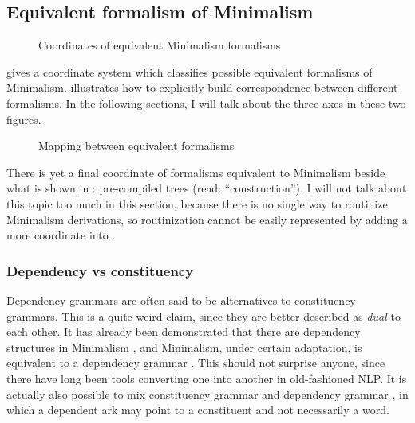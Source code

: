 \documentclass[../main.tex]{subfiles}
\begin{document}


\subsection{Equivalent formalism of Minimalism}

\begin{figure}
    \centering
    
    \caption{Coordinates of equivalent Minimalism formalisms} 
    \label{fig:coordinate-minimalism}
\end{figure}

 gives a coordinate system which classifies possible equivalent formalisms
of Minimalism.  illustrates how to explicitly build correspondence between 
different formalisms. In the following sections, I will talk about the three axes in these two figures. 

\begin{figure}
    \centering
    
    \caption{Mapping between equivalent formalisms}
    \label{fig:minimalism-mapping}
\end{figure}

There is yet a final coordinate of formalisms equivalent to Minimalism 
beside what is shown in : 
pre-compiled trees (read: ``construction''). 
I will not talk about this topic too much in this section, 
because there is no single way to routinize Minimalism derivations, 
so routinization cannot be easily represented 
by adding a more coordinate into .

\subsubsection{Dependency vs constituency}\label{sec:minimalist-dependency}

Dependency grammars are often said to be alternatives to constituency grammars.
This is a quite weird claim, since they are better described as \emph{dual} to each other.
It has already been demonstrated that there are dependency structures in Minimalism \citep{boston2009dependency},
and Minimalism, under certain adaptation, is equivalent to a dependency grammar \citep{osborne2011bare}.
This should not surprise anyone, since there have long been tools converting one into another in old-fashioned NLP.
It is actually also possible to mix constituency grammar and dependency grammar 
\cite{kahane-mazziotta-2015-syntactic}, in which a dependent ark may point to a constituent and not necessarily a word.
\end{document}

